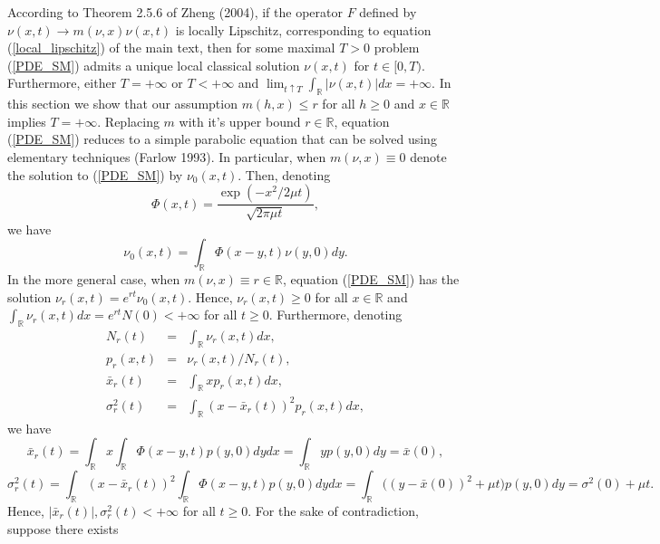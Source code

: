 \documentclass[]{article}
\begin{document}
According to Theorem 2.5.6 of Zheng (2004), if the operator \(F\)
defined by \(\nu(x,t)\to m(\nu,x)\nu(x,t)\) is locally Lipschitz,
corresponding to equation (\ref{local_lipschitz}) of the main text, then
for some maximal \(T>0\) problem (\ref{PDE_SM}) admits a unique local
classical solution \(\nu(x,t)\) for \(t\in[0,T)\). Furthermore, either
\(T=+\infty\) or \(T<+\infty\) and
\(\lim_{t\uparrow T}\int_\mathbb{R}|\nu(x,t)|dx=+\infty\). In this
section we show that our assumption \(m(h,x)\leq r\) for all \(h\geq0\)
and \(x\in\mathbb{R}\) implies \(T=+\infty\). Replacing \(m\) with it's
upper bound \(r\in\mathbb{R}\), equation (\ref{PDE_SM}) reduces to a
simple parabolic equation that can be solved using elementary techniques
(Farlow 1993). In particular, when \(m(\nu,x)\equiv0\) denote the
solution to (\ref{PDE_SM}) by \(\nu_0(x,t)\). Then, denoting
\begin{equation}
\Phi(x,t)=\frac{\exp\left(-x^2/2\mu t\right)}{\sqrt{2\pi\mu t}},
\end{equation} we have \begin{equation}
\nu_0(x,t)=\int_{\mathbb{R}}\Phi(x-y,t)\nu(y,0)dy.
\end{equation} In the more general case, when
\(m(\nu,x)\equiv r\in\mathbb{R}\), equation (\ref{PDE_SM}) has the
solution \(\nu_r(x,t)=e^{rt}\nu_0(x,t)\). Hence, \(\nu_r(x,t)\geq0\) for
all \(x\in\mathbb{R}\) and
\(\int_\mathbb{R}\nu_r(x,t)dx=e^{rt}N(0)<+\infty\) for all \(t\geq0\).
Furthermore, denoting \begin{equation}
\begin{matrix}
N_r(t)&=&\int_\mathbb{R}\nu_r(x,t)dx, \\
p_r(x,t)&=&\nu_r(x,t)/N_r(t), \\
\bar x_r(t)&=&\int_\mathbb{R}xp_r(x,t)dx, \\
\sigma^2_r(t)&=&\int_\mathbb{R}(x-\bar x_r(t))^2p_r(x,t)dx, 
\end{matrix}
\end{equation} we have \begin{equation}
\bar x_r(t)=\int_\mathbb{R}x\int_\mathbb{R}\Phi(x-y,t)p(y,0)dydx=\int_\mathbb{R}yp(y,0)dy=\bar x(0),
\end{equation} \begin{equation}
\sigma_r^2(t)=\int_\mathbb{R}(x-\bar x_r(t))^2\int_\mathbb{R}\Phi(x-y,t)p(y,0)dydx=\int_\mathbb{R}\Big((y-\bar x(0))^2+\mu t\Big)p(y,0)dy=\sigma^2(0)+\mu t.
\end{equation} Hence, \(|\bar x_r(t)|,\sigma_r^2(t)<+\infty\) for all
\(t\geq0\). For the sake of contradiction, suppose there exists
\end{document}
